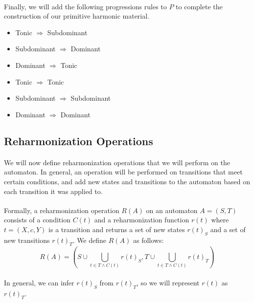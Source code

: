 \documentclass[]{article}
\begin{document}
\paragraph{} Finally, we will add the following progressions rules to $P$ to complete the construction of our primitive harmonic material.
\begin{itemize}
	\item Tonic $\Rightarrow$ Subdominant
	\item Subdominant $\Rightarrow$ Dominant
	\item Dominant $\Rightarrow$ Tonic
	\item Tonic $\Rightarrow$ Tonic
	\item Subdominant $\Rightarrow$ Subdominant
	\item Dominant $\Rightarrow$ Dominant
\end{itemize}

\subsection{Reharmonization Operations}
\paragraph{} We will now define reharmonization operations that we will perform on the automaton.  In general, an operation will be performed on transitions that meet certain conditions, and add new states and transitions to the automaton based on each transition it was applied to.

\paragraph{} Formally, a reharmonization operation $R(A)$ on an automaton $A = (S, T)$ consists of a condition $C(t)$ and a reharmonization function $r(t)$ where $t = (X, c, Y)$ is a transition and returns a set of new states $r(t)_S$ and a set of new transitions $r(t)_T$.  We define $R(A)$ as follows:
$$R(A) = (S \cup \bigcup_{t \in T \wedge C(t)} r(t)_S, T \cup \bigcup_{t \in T \wedge C(t)} r(t)_T)$$

\paragraph{} In general, we can infer $r(t)_S$ from $r(t)_T$, so we will represent $r(t)$ as $r(t)_T$.
\end{document}
